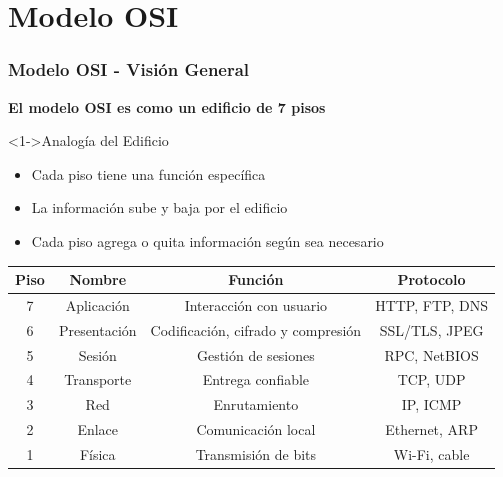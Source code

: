 \documentclass[aspectratio=169]{beamer}
\begin{document}
            \section{Modelo OSI}
            
            \begin{frame}
            \frametitle{Modelo OSI - Visión General}
            
            \begin{center}
            \Large \textbf{El modelo OSI es como un edificio de 7 pisos}
            \end{center}
            
            \begin{block}<1->{Analogía del Edificio}
            \begin{itemize}
            \item<1-> Cada piso tiene una función específica
            \item<2-> La información sube y baja por el edificio
            \item<3-> Cada piso agrega o quita información según sea necesario
            \end{itemize}
            \end{block}
            
            \begin{center}
            \begin{table}
            \centering
            \begin{tabular}{|c|c|c|c|}
            \hline
            \textbf{Piso} & \textbf{Nombre} & \textbf{Función} & \textbf{Protocolo} \\
            \hline
            \rowcolor{lightBlue} 7 & Aplicación & Interacción con usuario & HTTP, FTP, DNS \\
            \rowcolor{lightOrange} 6 & Presentación & Codificación, cifrado y compresión & SSL/TLS, JPEG \\
            \rowcolor{lightBlue} 5 & Sesión & Gestión de sesiones & RPC, NetBIOS \\
            \rowcolor{lightOrange} 4 & Transporte & Entrega confiable & TCP, UDP \\
            \rowcolor{lightBlue} 3 & Red & Enrutamiento & IP, ICMP \\
            \rowcolor{lightOrange} 2 & Enlace & Comunicación local & Ethernet, ARP \\
            \rowcolor{lightBlue} 1 & Física & Transmisión de bits & Wi-Fi, cable \\
            \hline
            \end{tabular}
            \end{table}
            \end{center}
            \end{frame}
            
\end{document}
